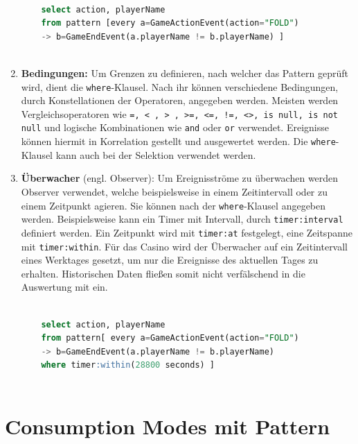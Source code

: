 \begin{enumerate}
	\begin{lstlisting}[caption={Pattern mit Follow-Operator },label=follow_pattern,captionpos=b,language=SQL]
	
	select action, playerName 
	from pattern [every a=GameActionEvent(action="FOLD") 
	-> b=GameEndEvent(a.playerName != b.playerName) ]
	
	\end{lstlisting}
	
	\item \textbf{Bedingungen:}
	Um Grenzen zu definieren, nach welcher das Pattern geprüft wird, dient die \texttt{where}-Klausel. Nach ihr können verschiedene Bedingungen, durch Konstellationen der Operatoren, angegeben werden.
	Meisten werden Vergleichsoperatoren wie \texttt{=, < , > , >=, <=, !=, <>, is null, is not null} und logische Kombinationen wie \texttt{and} oder \texttt{or} verwendet. Ereignisse können hiermit in Korrelation gestellt und ausgewertet werden. Die \texttt{where}- Klausel kann auch bei der Selektion verwendet werden.
	
	\item \textbf{Überwacher} (engl. Observer):
	Um Ereignisströme zu überwachen werden Observer verwendet, welche beispielsweise in einem Zeitintervall oder zu einem Zeitpunkt agieren. Sie können nach der \texttt{where}-Klausel angegeben werden. Beispielsweise kann ein Timer mit Intervall, durch \texttt{timer:interval} definiert werden. Ein Zeitpunkt wird mit \texttt{timer:at} festgelegt, eine Zeitspanne mit \texttt{timer:within}. Für das Casino wird der Überwacher auf ein Zeitintervall eines Werktages gesetzt, um nur die Ereignisse des aktuellen Tages zu erhalten. Historischen Daten fließen somit nicht verfälschend in die Auswertung mit ein.
	
	\begin{lstlisting}[caption={Pattern mit Observer },label=observer_pattern,captionpos=b,language=SQL]
	
	select action, playerName 
	from pattern[ every a=GameActionEvent(action="FOLD") 
	-> b=GameEndEvent(a.playerName != b.playerName)
	where timer:within(28800 seconds) ]
	
	\end{lstlisting}
	
\end{enumerate}

\section{Consumption Modes mit Pattern}

